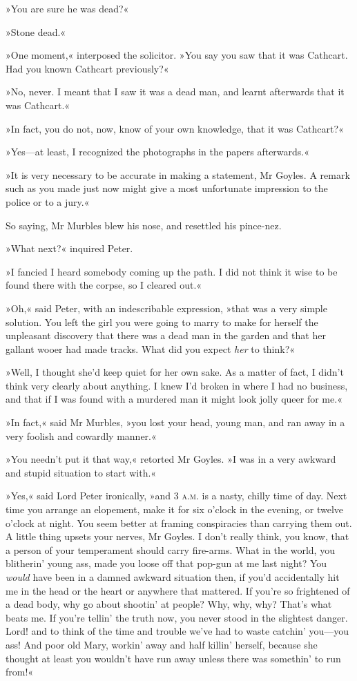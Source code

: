 »You are sure he was dead?«

»Stone dead.«

»One moment,« interposed the solicitor. »You say you saw that it was Cathcart. Had you known Cathcart previously?«

»No, never. I meant that I saw it was a dead man, and learnt afterwards that it was Cathcart.«

»In fact, you do not, now, know of your own knowledge, that it was Cathcart?«

»Yes\allowbreak---\allowbreak at least, I recognized the photographs in the papers afterwards.«

»It is very necessary to be accurate in making a statement, Mr Goyles.  A remark such as you made just now might give a most unfortunate impression to the police or to a jury.«

So saying, Mr Murbles blew his nose, and resettled his pince-nez.

»What next?« inquired Peter.

»I fancied I heard somebody coming up the path. I did not think it wise to be found there with the corpse, so I cleared out.«

»Oh,« said Peter, with an indescribable expression, »that was a very simple solution. You left the girl you were going to marry to make for herself the unpleasant discovery that there was a dead man in the garden and that her gallant wooer had made tracks. What did you expect \textit{her} to think?«

»Well, I thought she'd keep quiet for her own sake. As a matter of fact, I didn't think very clearly about anything. I knew I'd broken in where I had no business, and that if I was found with a murdered man it might look jolly queer for me.«

»In fact,« said Mr Murbles, »you lost your head, young man, and ran away in a very foolish and cowardly manner.«

»You needn't put it that way,« retorted Mr Goyles. »I was in a very awkward and stupid situation to start with.«

»Yes,« said Lord Peter ironically, »and 3 \textsc{a.m.} is a nasty, chilly time of day. Next time you arrange an elopement, make it for six o'clock in the evening, or twelve o'clock at night. You seem better at framing conspiracies than carrying them out. A little thing upsets your nerves, Mr Goyles. I don't really think, you know, that a person of your temperament should carry fire-arms. What in the world, you blitherin' young ass, made you loose off that pop-gun at me last night? You \textit{would} have been in a damned awkward situation then, if you'd accidentally hit me in the head or the heart or anywhere that mattered. If you're so frightened of a dead body, why go about shootin' at people? Why, why, why? That's what beats me. If you're tellin' the truth now, you never stood in the slightest danger. Lord! and to think of the time and trouble we've had to waste catchin' you\allowbreak---\allowbreak you ass! And poor old Mary, workin' away and half killin' herself, because she thought at least you wouldn't have run away unless there was somethin' to run from!«

